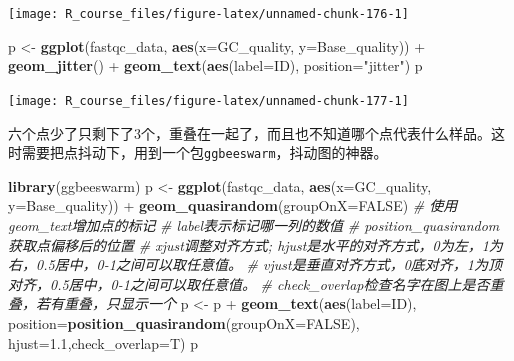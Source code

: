 \documentclass[]{article}
\newenvironment{Shaded}{\begin{snugshade}}{\end{snugshade}}
\newcommand{\KeywordTok}[1]{\textcolor[rgb]{0.13,0.29,0.53}{\textbf{{#1}}}}
\newcommand{\DataTypeTok}[1]{\textcolor[rgb]{0.13,0.29,0.53}{{#1}}}
\newcommand{\FloatTok}[1]{\textcolor[rgb]{0.00,0.00,0.81}{{#1}}}
\newcommand{\StringTok}[1]{\textcolor[rgb]{0.31,0.60,0.02}{{#1}}}
\newcommand{\CommentTok}[1]{\textcolor[rgb]{0.56,0.35,0.01}{\textit{{#1}}}}
\newcommand{\OtherTok}[1]{\textcolor[rgb]{0.56,0.35,0.01}{{#1}}}
\newcommand{\NormalTok}[1]{{#1}}
\numberwithin{figure}{section}
\numberwithin{table}{section}
\theoremstyle{definition}
\theoremstyle{definition}
\theoremstyle{definition}
\theoremstyle{remark}
\begin{document}
\begin{center}\texttt{[image: R\_course\_files/figure-latex/unnamed-chunk-176-1]} \end{center}

\begin{Shaded}
\begin{Highlighting}[]
\NormalTok{p <-}\StringTok{ }\KeywordTok{ggplot}\NormalTok{(fastqc_data, }\KeywordTok{aes}\NormalTok{(}\DataTypeTok{x=}\NormalTok{GC_quality, }\DataTypeTok{y=}\NormalTok{Base_quality)) +}\StringTok{ }
\StringTok{    }\KeywordTok{geom_jitter}\NormalTok{() +}\StringTok{ }\KeywordTok{geom_text}\NormalTok{(}\KeywordTok{aes}\NormalTok{(}\DataTypeTok{label=}\NormalTok{ID), }\DataTypeTok{position=}\StringTok{"jitter"}\NormalTok{)}
\NormalTok{p}
\end{Highlighting}
\end{Shaded}

\begin{center}\texttt{[image: R\_course\_files/figure-latex/unnamed-chunk-177-1]} \end{center}

六个点少了只剩下了3个，重叠在一起了，而且也不知道哪个点代表什么样品。这时需要把点抖动下，用到一个包\texttt{ggbeeswarm}，抖动图的神器。

\begin{Shaded}
\begin{Highlighting}[]
\KeywordTok{library}\NormalTok{(ggbeeswarm)}
\NormalTok{p <-}\StringTok{ }\KeywordTok{ggplot}\NormalTok{(fastqc_data, }\KeywordTok{aes}\NormalTok{(}\DataTypeTok{x=}\NormalTok{GC_quality, }\DataTypeTok{y=}\NormalTok{Base_quality)) +}\StringTok{ }
\StringTok{            }\KeywordTok{geom_quasirandom}\NormalTok{(}\DataTypeTok{groupOnX=}\OtherTok{FALSE}\NormalTok{)}
\CommentTok{# 使用geom_text增加点的标记}
\CommentTok{# label表示标记哪一列的数值}
\CommentTok{# position_quasirandom获取点偏移后的位置}
\CommentTok{# xjust调整对齐方式; hjust是水平的对齐方式，0为左，1为右，0.5居中，0-1之间可以取任意值。}
\CommentTok{# vjust是垂直对齐方式，0底对齐，1为顶对齐，0.5居中，0-1之间可以取任意值。}
\CommentTok{# check_overlap检查名字在图上是否重叠，若有重叠，只显示一个}
\NormalTok{p <-}\StringTok{ }\NormalTok{p +}\StringTok{ }\KeywordTok{geom_text}\NormalTok{(}\KeywordTok{aes}\NormalTok{(}\DataTypeTok{label=}\NormalTok{ID), }\DataTypeTok{position=}\KeywordTok{position_quasirandom}\NormalTok{(}\DataTypeTok{groupOnX=}\OtherTok{FALSE}\NormalTok{), }
        \DataTypeTok{hjust=}\FloatTok{1.1}\NormalTok{,}\DataTypeTok{check_overlap=}\NormalTok{T)}
\NormalTok{p}
\end{Highlighting}
\end{Shaded}
\end{document}

